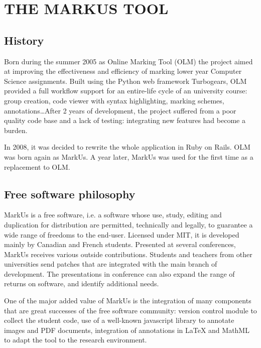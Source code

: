\documentclass[twocolumn,10pt]{asme2e}
\begin{document}
\section*{THE MARKUS TOOL}



\subsection*{History}

Born during the summer 2005 as Online Marking Tool (OLM) the project aimed at
improving the effectiveness and efficiency of marking lower year Computer
Science assignments. Built using the Python web framework Turbogears, OLM
provided a full workflow support for an entire-life cycle of an university
course: group creation, code viewer with syntax highlighting, marking schemes,
annotations\dots After 2 years of development, the project suffered from a poor
quality code base and a lack of testing: integrating new features had become a
burden.

In 2008, it was decided to rewrite the whole application in Ruby on Rails. OLM
was born again as MarkUs. A year later, MarkUs was used for the first time as
a replacement to OLM.

\subsection*{Free software philosophy}
MarkUs is a free software, i.e. a software whose use, study, editing and duplication for distribution are permitted, technically and legally, to guarantee a wide range of freedoms to the end-user. Licensed under MIT, it is developed mainly by Canadian and French students.
Presented at several conferences, MarkUs receives various outside contributions. Students and teachers from other universities send patches that are integrated with the main branch of development. The presentations in conference can also expand the range of returns on software, and identify additional needs.

One of the major added value of MarkUs is the integration of many components that are great successes of the free software community: version control module to collect the student code, use of a well-known javascript library to annotate images and PDF documents, integration of annotations in LaTeX and MathML to adapt the tool to the research environment. 
\end{document}
